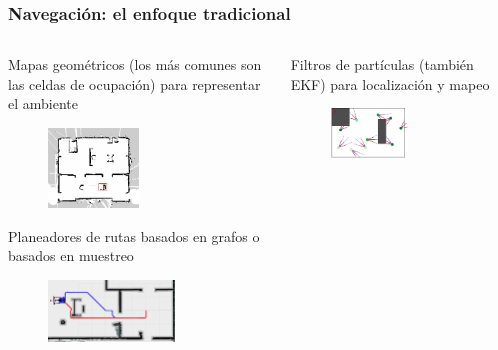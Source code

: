 \begin{frame}\frametitle{Navegación: el enfoque tradicional}
  \begin{columns}
    \begin{column}{0.5\textwidth}
      Mapas geométricos (los más comunes son las celdas de ocupación) para representar el ambiente
      \begin{figure}
        \centering
        \includegraphics[width=0.5\textwidth]{Figures/MotionPlanning/OccupancyGrid.png}
      \end{figure}
      Planeadores de rutas basados en grafos o basados en muestreo
      \begin{figure}
        \centering
        \includegraphics[width=0.7\textwidth]{Figures/MotionPlanning/AStarComparison.png}
      \end{figure}
    \end{column}
    \begin{column}{0.5\textwidth}
      Filtros de partículas (también EKF) para localización y mapeo
      \begin{figure}
        \centering
        \includegraphics[width=0.55\textwidth]{Figures/MotionPlanning/ParticleFilter4.pdf}

\end{figure}
\end{column}
\end{columns}
\end{frame}
